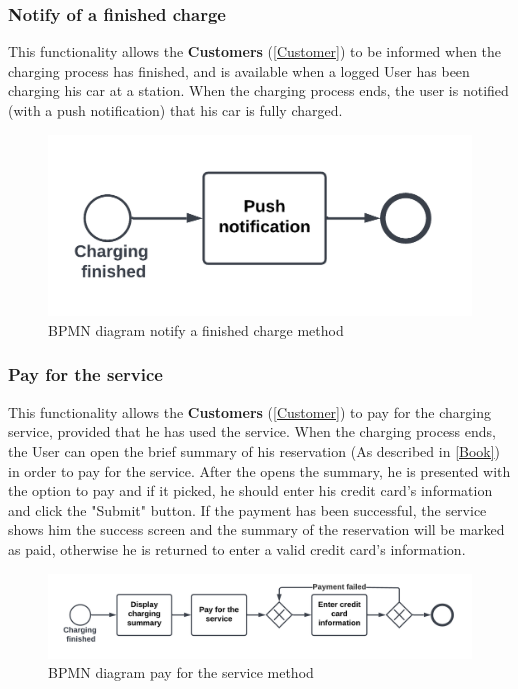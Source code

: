 \subsubsection{Notify of a finished charge}
This functionality allows the \textbf{Customers} (\ref{Customer}) to be informed when the charging process has finished, and is available when a logged User has been charging his car at a station.
When the charging process ends, the user is notified (with a push notification) that his car is fully charged.
\begin{figure}[H]
    \begin{center}
        \includegraphics[scale=0.2]{img/fun-not-fin.png}
        \caption{BPMN diagram notify a finished charge method}
    \end{center}
\end{figure}
\subsubsection{Pay for the service}
This functionality allows the \textbf{Customers} (\ref{Customer}) to pay for the charging service, provided that he has used the service.
When the charging process ends, the User can open the brief summary of his reservation (As described in \ref{Book}) in order to pay for the service.
After the opens the summary, he is presented with the option to pay and if it picked, he should enter his credit card's information and click the "Submit" button.
If the payment has been successful, the service shows him the success screen and the summary of the reservation will be marked as paid, otherwise he is returned to enter a valid credit card's information.
\begin{figure}[H]
    \begin{center}
        \includegraphics[width=\textwidth]{img/fun-pay.png}
        \caption{BPMN diagram pay for the service method}
    \end{center}
\end{figure}
